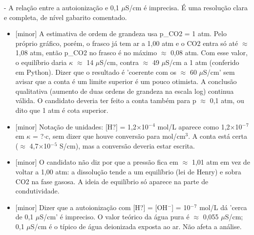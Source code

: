 \documentclass{article}%
\begin{document}
{-} A relação entre a autoionização e 0,1 $\mu$S/cm é imprecisa.\newline%
\newline%
É uma resolução clara e completa, de nível gabarito comentado.%
\begin{itemize}%
\item%
{[}minor{]} A estimativa de ordem de grandeza usa p\_CO2 = 1 atm. Pelo próprio gráfico, porém, o frasco já tem ar a 1,00 atm e o CO2 entra só até $\approx$ 1,08 atm, então p\_CO2 no frasco é no máximo $\approx$ 0,08 atm. Com esse valor, o equilíbrio daria $\kappa$ $\approx$ 14 $\mu$S/cm, contra $\approx$ 49 $\mu$S/cm a 1 atm (conferido em Python). Dizer que o resultado é 'coerente com os $\approx$ 60 $\mu$S/cm' sem avisar que a conta é um limite superior é um pouco otimista. A conclusão qualitativa (aumento de duas ordens de grandeza na escala log) continua válida. O candidato deveria ter feito a conta também para p $\approx$ 0,1 atm, ou dito que 1 atm é cota superior.%
\item%
{[}minor{]} Notação de unidades: {[}H?{]} = 1,2$\times$10$^{-}$$^{4}$ mol/L aparece como 1,2$\times$10$^{-}$$^{7}$ em $\kappa$ = ?$\cdot$c, sem dizer que houve conversão para mol/cm$^3$. A conta está certa ($\approx$ 4,7$\times$10$^{-}$$^{5}$ S/cm), mas a conversão deveria estar escrita.%
\item%
{[}minor{]} O candidato não diz por que a pressão fica em $\approx$ 1,01 atm em vez de voltar a 1,00 atm: a dissolução tende a um equilíbrio (lei de Henry) e sobra CO2 na fase gasosa. A ideia de equilíbrio só aparece na parte de condutividade.%
\item%
{[}minor{]} Dizer que a autoionização com {[}H?{]} = {[}OH$^{-}${]} = 10$^{-}$$^{7}$ mol/L dá 'cerca de 0,1 $\mu$S/cm' é impreciso. O valor teórico da água pura é $\approx$ 0,055 $\mu$S/cm; 0,1 $\mu$S/cm é o típico de água deionizada exposta ao ar. Não afeta a análise.%
\end{itemize}%
\end{document}
